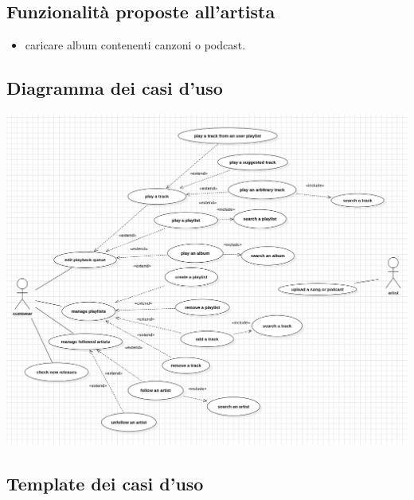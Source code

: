 \documentclass{article}
\begin{document}
  \subsection{Funzionalità proposte all'artista}

  \begin{itemize}
    \item
    caricare album contenenti canzoni o podcast.
  \end{itemize}

  \subsection{Diagramma dei casi d'uso}
  \includegraphics[scale=0.33]{usecase04}

  \subsection{Template dei casi d'uso}
\end{document}
